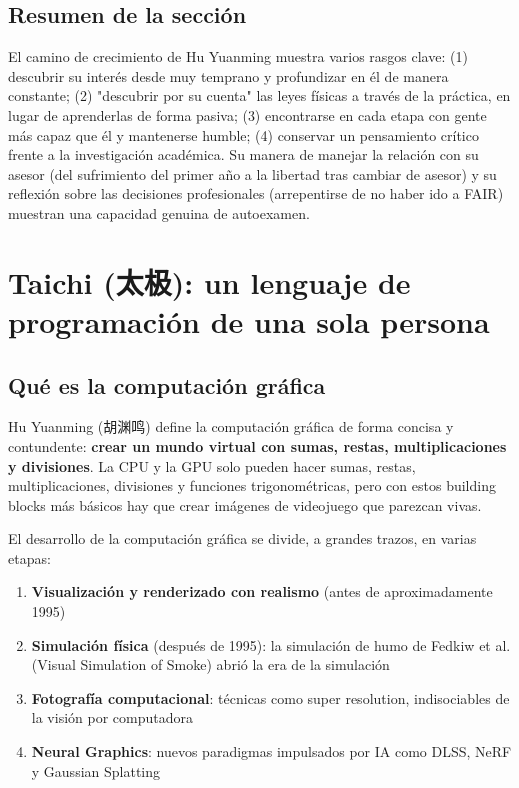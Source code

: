 \documentclass[a4paper]{article}
\begin{document}
\subsection{Resumen de la sección}

El camino de crecimiento de Hu Yuanming muestra varios rasgos clave: (1) descubrir su interés desde muy temprano y profundizar en él de manera constante; (2) "descubrir por su cuenta" las leyes físicas a través de la práctica, en lugar de aprenderlas de forma pasiva; (3) encontrarse en cada etapa con gente más capaz que él y mantenerse humble; (4) conservar un pensamiento crítico frente a la investigación académica. Su manera de manejar la relación con su asesor (del sufrimiento del primer año a la libertad tras cambiar de asesor) y su reflexión sobre las decisiones profesionales (arrepentirse de no haber ido a FAIR) muestran una capacidad genuina de autoexamen.
\section{Taichi (太极): un lenguaje de programación de una sola persona}

\subsection{Qué es la computación gráfica}

Hu Yuanming (胡渊鸣) define la computación gráfica de forma concisa y contundente: \textbf{crear un mundo virtual con sumas, restas, multiplicaciones y divisiones}. La CPU y la GPU solo pueden hacer sumas, restas, multiplicaciones, divisiones y funciones trigonométricas, pero con estos building blocks más básicos hay que crear imágenes de videojuego que parezcan vivas.

El desarrollo de la computación gráfica se divide, a grandes trazos, en varias etapas:

\begin{enumerate}
\item \textbf{Visualización y renderizado con realismo} (antes de aproximadamente 1995)
\item \textbf{Simulación física} (después de 1995): la simulación de humo de Fedkiw et al. (Visual Simulation of Smoke) abrió la era de la simulación
\item \textbf{Fotografía computacional}: técnicas como super resolution, indisociables de la visión por computadora
\item \textbf{Neural Graphics}: nuevos paradigmas impulsados por IA como DLSS, NeRF y Gaussian Splatting
\end{enumerate}
\end{document}
